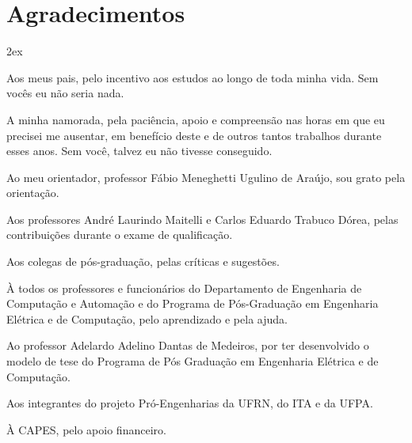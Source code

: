 \chapter*{Agradecimentos}
\thispagestyle{empty}

\begin{trivlist}  \itemsep 2ex

\item Aos meus pais, pelo incentivo aos estudos ao longo de toda minha vida. Sem
vocês eu não seria nada.

\item A minha namorada, pela paciência, apoio e compreensão nas horas em que eu
precisei me ausentar, em benefício deste e de outros tantos trabalhos durante
esses anos. Sem você, talvez eu não tivesse conseguido.

\item Ao meu orientador, professor Fábio Meneghetti Ugulino de Araújo, sou grato
pela orientação.

\item Aos professores André Laurindo Maitelli e Carlos Eduardo Trabuco Dórea,
pelas contribuições durante o exame de qualificação.

\item Aos colegas de pós-graduação, pelas críticas e sugestões.

\item À todos os professores e funcionários do Departamento de Engenharia de
Computação e Automação e do Programa de Pós-Graduação em Engenharia Elétrica e
de Computação, pelo aprendizado e pela ajuda.

\item Ao professor Adelardo Adelino Dantas de Medeiros, por ter desenvolvido o
modelo de tese do Programa de Pós Graduação em Engenharia Elétrica e de
Computação.

\item Aos integrantes do projeto Pró-Engenharias da UFRN, do ITA e da UFPA.

\item À CAPES, pelo apoio financeiro.

\end{trivlist}
